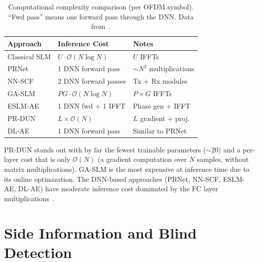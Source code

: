 \begin{table}[H]
    \centering
    \caption{Computational complexity comparison (per OFDM symbol).
             ``Fwd pass'' means one forward pass through the DNN.
             Data from~\cite{kim2017novel,zou2021novel,ali2016new,nguyen2022deep}.}
    \label{tab:complexity_comparison}
    \begin{tabular}{@{} l l l @{}}
        \toprule
        \textbf{Approach} & \textbf{Inference Cost} & \textbf{Notes} \\
        \midrule
        Classical SLM & $U \cdot \mathcal{O}(N\log N)$ & $U$ IFFTs \\
        PRNet & 1 DNN forward pass & $\sim$$N^2$ multiplications \\
        NN-SCF & 2 DNN forward passes & Tx + Rx modules \\
        GA-SLM & $PG \cdot \mathcal{O}(N\log N)$ & $P \times G$ IFFTs \\
        ESLM-AE & 1 DNN fwd + 1 IFFT & Phase gen + IFFT \\
        PR-DUN & $L \times \mathcal{O}(N)$ & $L$ gradient + proj. \\
        DL-AE & 1 DNN forward pass & Similar to PRNet \\
        \bottomrule
    \end{tabular}
\end{table}

\begin{keyinsight}
    PR-DUN stands out with by far the fewest trainable parameters ($\sim 20$)
    and a per-layer cost that is only $\mathcal{O}(N)$ (a gradient computation
    over $N$ samples, without matrix multiplications).
    GA-SLM is the most expensive at inference time due to its online
    optimization.  The DNN-based approaches (PRNet, NN-SCF, ESLM-AE,
    DL-AE) have moderate inference cost dominated by the FC layer
    multiplications~\cite{nguyen2022deep}.
\end{keyinsight}


\section{Side Information and Blind Detection}
\label{sec:comparison_si}

